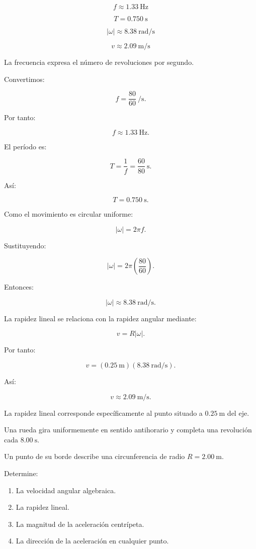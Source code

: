 \begin{respuesta}
\[
\boxed{f\approx\SI{1.33}{\hertz}}
\]

\[
\boxed{T=\SI{0.750}{\second}}
\]

\[
\boxed{|\omega|\approx\SI{8.38}{\radian\per\second}}
\]

\[
\boxed{v\approx\SI{2.09}{\meter\per\second}}
\]
\end{respuesta}

\begin{explicacion}
La frecuencia expresa el número de revoluciones por segundo.

Convertimos:

\[
f=\frac{80}{60}\ \si{\per\second}.
\]

Por tanto:

\[
\boxed{f\approx\SI{1.33}{\hertz}}.
\]

El período es:

\[
T=\frac{1}{f}=\frac{60}{80}\ \si{\second}.
\]

Así:

\[
\boxed{T=\SI{0.750}{\second}}.
\]

Como el movimiento es circular uniforme:

\[
|\omega|=2\pi f.
\]

Sustituyendo:

\[
|\omega|=2\pi\left(\frac{80}{60}\right).
\]

Entonces:

\[
\boxed{|\omega|\approx\SI{8.38}{\radian\per\second}}.
\]

La rapidez lineal se relaciona con la rapidez angular mediante:

\[
v=R|\omega|.
\]

Por tanto:

\[
v=(\SI{0.25}{\meter})
(\SI{8.38}{\radian\per\second}).
\]

Así:

\[
\boxed{v\approx\SI{2.09}{\meter\per\second}}.
\]

La rapidez lineal corresponde específicamente al punto situado a
\(\SI{0.25}{\meter}\) del eje.
\end{explicacion}


\begin{ejercicio}
Una rueda gira uniformemente en sentido antihorario y completa
una revolución cada \(\SI{8.00}{\second}\).

Un punto de su borde describe una circunferencia de radio
\(R=\SI{2.00}{\meter}\).

Determine:

\begin{enumerate}[label=\alph*)]
    \item La velocidad angular algebraica.
    \item La rapidez lineal.
    \item La magnitud de la aceleración centrípeta.
    \item La dirección de la aceleración en cualquier punto.
\end{enumerate}
\end{ejercicio}

